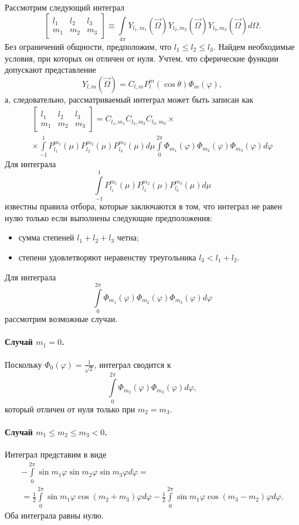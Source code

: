 Рассмотрим следующий интеграл
\[
\begin{bmatrix}
l_1 & l_2 & l_3\\
m_1 & m_2 & m_3
\end{bmatrix} \equiv
\int\limits_{4\pi}
Y_{l_1,m_1}(\vec \Omega)
Y_{l_2,m_2}(\vec \Omega)
Y_{l_3,m_3}(\vec \Omega)
d\Omega.
\]
Без ограничений общности, предположим, что $l_1 \leq l_2 \leq l_3$.
Найдем необходимые условия, при которых он отличен от нуля. Учтем, что сферические функции допускают представление
\[
Y_{l,m}(\vec \Omega) = C_{l,m} P_l^{m}(\cos \theta) \Phi_m(\varphi),
\]
а, следовательно, рассматриваемый интеграл может быть записан как
\begin{multline*}
\begin{bmatrix}
l_1 & l_2 & l_3\\
m_1 & m_2 & m_3
\end{bmatrix} =
C_{l_1,m_1}
C_{l_2,m_2}
C_{l_3,m_3} \times \\ \times
\int\limits_{-1}^1 
P_{l_1}^{m_1}(\mu)
P_{l_2}^{m_2}(\mu)
P_{l_3}^{m_3}(\mu)
d\mu
\int\limits_{0}^{2\pi}
\Phi_{m_1}(\varphi)
\Phi_{m_2}(\varphi)
\Phi_{m_3}(\varphi)
d\varphi
\end{multline*}
Для интеграла
\[
\int\limits_{-1}^1 
P_{l_1}^{m_1}(\mu)
P_{l_2}^{m_2}(\mu)
P_{l_3}^{m_3}(\mu)
d\mu
\]
известны \cite{Gaunt1929} правила отбора, которые заключаются в том, что интеграл не равен нулю только если выполнены следующие предположения:
\begin{itemize}
\item сумма степеней $l_1 + l_2 + l_3$ четна;
\item степени удовлетворяют неравенству треугольника $l_3 < l_1 + l_2$.
\end{itemize}

Для интеграла 
\[
\int\limits_{0}^{2\pi}
\Phi_{m_1}(\varphi)
\Phi_{m_2}(\varphi)
\Phi_{m_3}(\varphi)
d\varphi
\]
рассмотрим возможные случаи.
\paragraph{Случай $m_1 = 0$.} Поскольку $\Phi_0(\varphi) = \frac{1}{\sqrt{2}}$, интеграл сводится к 
\[
\int\limits_{0}^{2\pi}
\Phi_{m_2}(\varphi)
\Phi_{m_3}(\varphi)
d\varphi,
\]
который отличен от нуля только при $m_2 = m_3$.
\paragraph{Случай $m_1 \leq m_2 \leq m_3 < 0$.} Интеграл представим в виде
\begin{multline*}
-\int\limits_{0}^{2\pi}
\sin m_1 \varphi
\sin m_2 \varphi
\sin m_3 \varphi
d\varphi = \\ 
= 
\frac{1}{2}\int\limits_{0}^{2\pi}
\sin m_1 \varphi
\cos (m_2 + m_3) \varphi
d\varphi 
-
\frac{1}{2}\int\limits_{0}^{2\pi}
\sin m_1 \varphi
\cos (m_3 - m_2) \varphi
d\varphi.
\end{multline*}
Оба интеграла равны нулю. 

